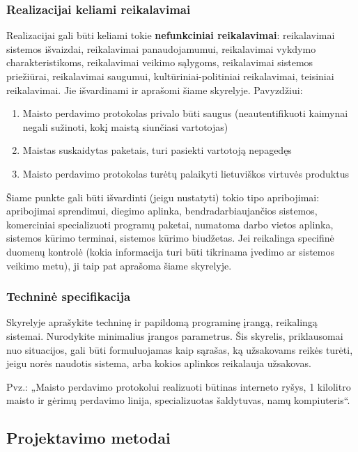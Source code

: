 \documentclass{ktuthesis}
\begin{document}
	\subsubsection{Realizacijai keliami reikalavimai}
	
	Realizacijai gali būti keliami tokie \textbf{nefunkciniai reikalavimai}: reikalavimai sistemos išvaizdai, reikalavimai panaudojamumui, reikalavimai vykdymo charakteristikoms,
	reikalavimai veikimo sąlygoms, reikalavimai sistemos priežiūrai, reikalavimai saugumui, kultūriniai-politiniai reikalavimai, teisiniai reikalavimai. Jie išvardinami
	ir aprašomi šiame skyrelyje. Pavyzdžiui:
	\begin{enumerate}
		\item Maisto perdavimo protokolas privalo būti saugus (neautentifikuoti kaimynai negali sužinoti, kokį maistą siunčiasi vartotojas)
		\item Maistas suskaidytas paketais, turi pasiekti vartotoją nepagedęs
		\item Maisto perdavimo protokolas turėtų palaikyti lietuviškos virtuvės produktus
	\end{enumerate}
	
	Šiame punkte gali būti išvardinti (jeigu nustatyti) tokio tipo apribojimai: apribojimai sprendimui, diegimo aplinka, bendradarbiaujančios sistemos, komerciniai
	specializuoti programų paketai, numatoma darbo vietos aplinka, sistemos kūrimo terminai, sistemos kūrimo biudžetas. Jei reikalinga specifinė duomenų kontrolė
	(kokia informacija turi būti tikrinama įvedimo ar sistemos veikimo metu), ji taip pat aprašoma šiame skyrelyje.
	
	\subsubsection{Techninė specifikacija}
	
	Skyrelyje aprašykite techninę ir papildomą programinę įrangą, reikalingą sistemai. Nurodykite minimalius įrangos parametrus. Šis skyrelis, priklausomai nuo
	situacijos, gali būti formuluojamas kaip sąrašas, ką užsakovams reikės turėti, jeigu norės naudotis sistema, arba kokios aplinkos reikalauja užsakovas.
	
	Pvz.: „Maisto perdavimo protokolui realizuoti būtinas interneto ryšys, 1 kilolitro maisto ir gėrimų perdavimo linija, specializuotas šaldytuvas, namų kompiuteris“.
	
	\subsection{Projektavimo metodai}
	
\end{document}
